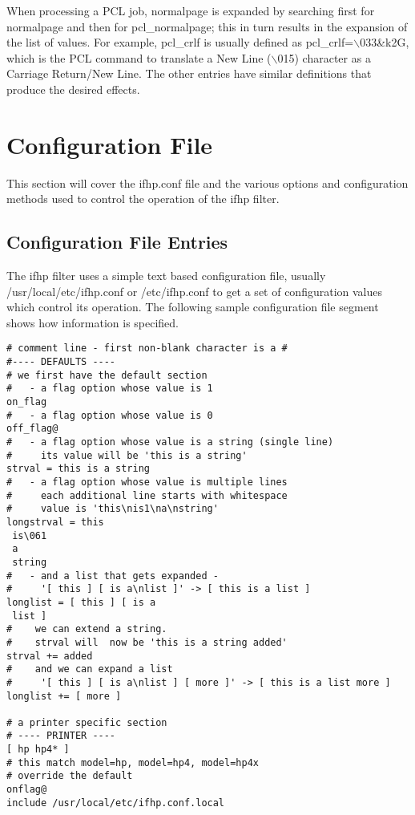 \documentclass[a4paper]{article}
\begin{document}
When processing a PCL job, {\ttfamily normalpage} is expanded by searching first
for {\ttfamily normalpage} and then for {\ttfamily pcl\_normalpage};
this in turn results in the expansion of the list of values.
For example,
{\ttfamily pcl\_crlf} is usually defined as {\ttfamily pcl\_crlf=$\backslash$033\&k2G},
which is the PCL command to translate a New Line ({\ttfamily $\backslash$015}) character
as a Carriage Return/New Line.
The other entries have similar definitions that produce the
desired effects.




\section{Configuration File}

This section will cover the {\ttfamily ifhp.conf} file and the various options
and configuration methods used to control the operation of the {\ttfamily ifhp}
filter.


\subsection{Configuration File Entries}

The {\ttfamily ifhp} filter uses a simple text based configuration file,
usually {\ttfamily /usr/local/etc/ifhp.conf} or {\ttfamily /etc/ifhp.conf}
to get a set of configuration values which control its operation.
The following sample configuration file segment shows how information
is specified.
\begin{tscreen}
\begin{verbatim}
# comment line - first non-blank character is a #
#---- DEFAULTS ----
# we first have the default section
#   - a flag option whose value is 1
on_flag
#   - a flag option whose value is 0
off_flag@
#   - a flag option whose value is a string (single line)
#     its value will be 'this is a string'
strval = this is a string
#   - a flag option whose value is multiple lines
#     each additional line starts with whitespace
#     value is 'this\nis1\na\nstring'
longstrval = this
 is\061
 a
 string
#   - and a list that gets expanded -
#     '[ this ] [ is a\nlist ]' -> [ this is a list ]
longlist = [ this ] [ is a
 list ]
#    we can extend a string.
#    strval will  now be 'this is a string added'
strval += added
#    and we can expand a list
#     '[ this ] [ is a\nlist ] [ more ]' -> [ this is a list more ]
longlist += [ more ]

# a printer specific section
# ---- PRINTER ----
[ hp hp4* ]
# this match model=hp, model=hp4, model=hp4x
# override the default
onflag@
include /usr/local/etc/ifhp.conf.local
\end{verbatim}
\end{tscreen}
\end{document}
